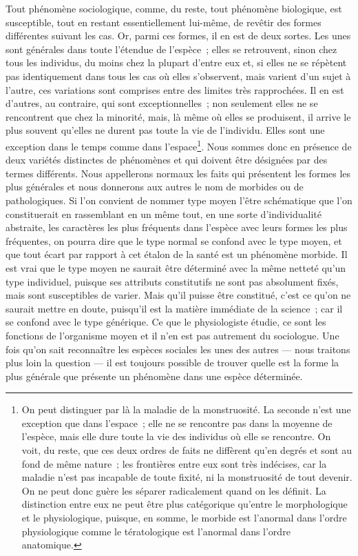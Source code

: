 \documentclass[french,twoside]{book} %
\begin{document}
Tout phénomène sociologique, comme, du reste, tout phénomène biologique, est susceptible, tout en restant essentiellement lui-même, de revêtir des formes différentes suivant les cas. Or, parmi ces formes, il en est de deux sortes. Les unes sont générales dans toute l’étendue de l’espèce ; elles se retrouvent, sinon chez tous les individus, du moins chez la plupart d’entre eux et, si elles ne se répètent pas identiquement dans tous les cas où elles s’observent, mais varient d’un sujet à l’autre, ces variations sont comprises entre des limites très rapprochées. Il en est d’autres, au contraire, qui sont exceptionnelles ; non seulement elles ne se rencontrent que chez la minorité, mais, là même où elles se produisent, il arrive le plus souvent qu’elles ne durent pas toute la vie de l’individu. Elles sont une exception dans le temps comme dans l’espace\footnote{ On peut distinguer par là la maladie de la monstruosité. La seconde n’est une exception que dans l’espace ; elle ne se rencontre pas dans la moyenne de l’espèce, mais elle dure toute la vie des individus où elle se rencontre. On voit, du reste, que ces deux ordres de faits ne diffèrent qu’en degrés et sont au fond de même nature ; les frontières entre eux sont très indécises, car la maladie n’est pas incapable de toute fixité, ni la monstruosité de tout devenir. On ne peut donc guère les séparer radicalement quand on les définit. La distinction entre eux ne peut être plus catégorique qu’entre le morphologique et le physiologique, puisque, en somme, le morbide est l’anormal dans l’ordre physiologique comme le tératologique est l’anormal dans l’ordre anatomique.}. Nous sommes donc en présence de deux variétés distinctes de phénomènes et qui doivent être désignées par des termes différents. Nous appellerons normaux les faits qui présentent les formes les plus générales et nous donnerons aux autres le nom de morbides ou de pathologiques. Si l’on convient de nommer type moyen l’être schématique que l’on constituerait en rassemblant en un même tout, en une sorte d’individualité abstraite, les caractères les plus fréquents dans l’espèce avec leurs formes les plus fréquentes, on pourra dire que le type normal se confond avec le type moyen, et que tout écart par rapport à cet étalon de la santé est un phénomène morbide. Il est vrai que le type moyen ne saurait être déterminé avec la même netteté qu’un type individuel, puisque ses attributs constitutifs ne sont pas absolument fixés, mais sont susceptibles de varier. Mais qu’il puisse être constitué, c’est ce qu’on ne saurait mettre en doute, puisqu’il est la matière immédiate de la science ; car il se confond avec le type générique. Ce que le physiologiste étudie, ce sont les fonctions de l’organisme moyen et il n’en est pas autrement du sociologue. Une fois qu’on sait reconnaître les espèces sociales les unes des autres — nous traitons plus loin la question — il est toujours possible de trouver quelle est la forme la plus générale que présente un phénomène dans une espèce déterminée.\par
\end{document}
